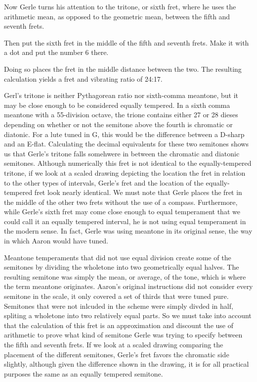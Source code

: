 Now Gerle turns his attention to the tritone, or sixth fret, where he uses the
arithmetic mean, as opposed to the geometric mean, between the fifth and seventh
frets.
\begin{blocks}
Then put the sixth fret in the middle of the fifth and seventh frets.  Make it
with a dot and put the number 6 there.
\end{blocks}
Doing so places the fret in the middle distance between the two.
The resulting calculation yields a fret and vibrating ratio of
24:17.

Gerl's tritone is neither Pythagorean ratio nor sixth-comma
meantone, but it may be close enough to be considered equally tempered.
In a sixth comma
meantone with a 55-division octave, the trione contains either 27 or 28 dieses depending on
whether or not the semitone above the fourth is chromatic or diatonic.  For a lute
tuned in G, this would be the difference between a D-sharp and an E-flat.
Calculating the decimal equivalents for these two semitones shows us that Gerle's tritone
falls somehwere in between the chromatic and diatonic
semitones.  Although numerically this fret is not identical to the equally-tempered
tritone, if we look at a scaled
drawing depicting the location the fret in relation to the other types of intervals,
Gerle's fret and the location of the equally-tempered fret look nearly identical.
We must note that Gerle places the fret in the middle of the other two frets without
the use of a compass.  Furthermore, while Gerle's sixth fret may come close enough
to equal temperament that we could
call it an equally tempered interval, he is not using equal temperament in the modern
sense.  In fact, Gerle was using meantone in its original sense, the way in which
Aaron would have tuned.

Meantone temperaments that did not use equal division create some of the semitones by dividing
the wholetone into two geometrically equal halves. The
resulting semitone was simply the mean, or average, of the tone, which is where the term
meantone originates.  Aaron's original instructions did not consider every semitone in the scale,
it only covered a set of thirds that were tuned pure.  Semitones that were not inlcuded in the
scheme were simply divded in half, spliting a wholetone into two relatively equal parts.
So we must take into account that the
calculation of this fret is an approximation and discount the use of
arithmetic to prove what kind of semitone Gerle was trying to specify between
the fifth and seventh frets.  If we look at a scaled drawing comparing the
placement of the different semitones, Gerle's fret favors the chromatic side
slightly, although given the difference shown in the drawing, it is for all
practical purposes the same as an equally tempered semitone.


